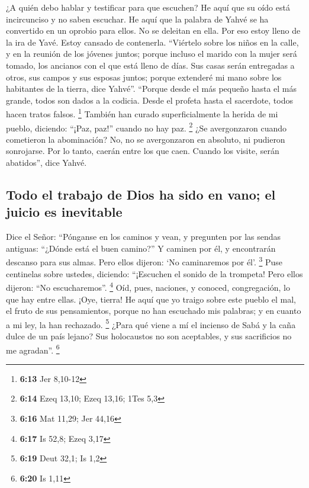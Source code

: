  ¿A quién debo hablar y testificar para que escuchen? He
aquí que su oído está incircunciso y no saben escuchar. He aquí que la
palabra de Yahvé se ha convertido en un oprobio para ellos. No se
deleitan en ella.  Por eso estoy lleno de la ira de Yavé.
Estoy cansado de contenerla. ``Viértelo sobre los niños en la calle, y
en la reunión de los jóvenes juntos; porque incluso el marido con la
mujer será tomado, los ancianos con el que está lleno de días.
 Sus casas serán entregadas a otros, sus campos y sus
esposas juntos; porque extenderé mi mano sobre los habitantes de la
tierra, dice Yahvé''.  ``Porque desde el más pequeño
hasta el más grande, todos son dados a la codicia. Desde el profeta
hasta el sacerdote, todos hacen tratos falsos. \footnote{\textbf{6:13}
  Jer 8,10-12}  También han curado superficialmente la
herida de mi pueblo, diciendo: ``¡Paz, paz!'' cuando no hay paz.
\footnote{\textbf{6:14} Ezeq 13,10; Ezeq 13,16; 1Tes 5,3}
 ¿Se avergonzaron cuando cometieron la abominación? No,
no se avergonzaron en absoluto, ni pudieron sonrojarse. Por lo tanto,
caerán entre los que caen. Cuando los visite, serán abatidos'', dice
Yahvé.

\hypertarget{todo-el-trabajo-de-dios-ha-sido-en-vano-el-juicio-es-inevitable}{%
\subsection{Todo el trabajo de Dios ha sido en vano; el juicio es
inevitable}\label{todo-el-trabajo-de-dios-ha-sido-en-vano-el-juicio-es-inevitable}}

 Dice el Señor: ``Pónganse en los caminos y vean, y
pregunten por las sendas antiguas: ``¿Dónde está el buen camino?'' Y
caminen por él, y encontrarán descanso para sus almas. Pero ellos
dijeron: `No caminaremos por él'. \footnote{\textbf{6:16} Mat 11,29; Jer
  44,16}  Puse centinelas sobre ustedes, diciendo:
``¡Escuchen el sonido de la trompeta! Pero ellos dijeron: ``No
escucharemos''. \footnote{\textbf{6:17} Is 52,8; Ezeq 3,17}
 Oíd, pues, naciones, y conoced, congregación, lo que hay
entre ellas.  ¡Oye, tierra! He aquí que yo traigo sobre
este pueblo el mal, el fruto de sus pensamientos, porque no han
escuchado mis palabras; y en cuanto a mi ley, la han rechazado.
\footnote{\textbf{6:19} Deut 32,1; Is 1,2}  ¿Para qué
viene a mí el incienso de Sabá y la caña dulce de un país lejano? Sus
holocaustos no son aceptables, y sus sacrificios no me agradan''.
\footnote{\textbf{6:20} Is 1,11}

